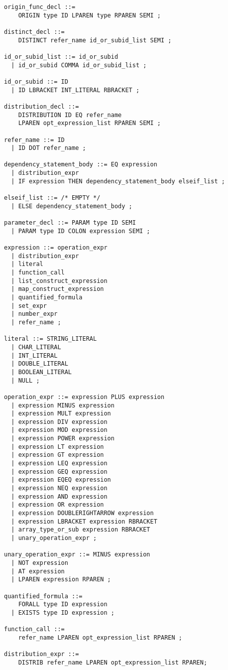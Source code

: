 \documentclass[12pt]{article}
\begin{document}
\begin{verbatim}
origin_func_decl ::= 
    ORIGIN type ID LPAREN type RPAREN SEMI ;

distinct_decl ::=
    DISTINCT refer_name id_or_subid_list SEMI ;

id_or_subid_list ::= id_or_subid
  | id_or_subid COMMA id_or_subid_list ;

id_or_subid ::= ID
  | ID LBRACKET INT_LITERAL RBRACKET ;

distribution_decl ::=
    DISTRIBUTION ID EQ refer_name
    LPAREN opt_expression_list RPAREN SEMI ;

refer_name ::= ID
  | ID DOT refer_name ;

dependency_statement_body ::= EQ expression
  | distribution_expr
  | IF expression THEN dependency_statement_body elseif_list ;

elseif_list ::= /* EMPTY */
  | ELSE dependency_statement_body ;

parameter_decl ::= PARAM type ID SEMI
  | PARAM type ID COLON expression SEMI ;

expression ::= operation_expr
  | distribution_expr
  | literal
  | function_call
  | list_construct_expression
  | map_construct_expression
  | quantified_formula
  | set_expr
  | number_expr
  | refer_name ;

literal ::= STRING_LITERAL
  | CHAR_LITERAL
  | INT_LITERAL
  | DOUBLE_LITERAL
  | BOOLEAN_LITERAL
  | NULL ;

operation_expr ::= expression PLUS expression
  | expression MINUS expression
  | expression MULT expression
  | expression DIV expression
  | expression MOD expression
  | expression POWER expression
  | expression LT expression
  | expression GT expression
  | expression LEQ expression
  | expression GEQ expression
  | expression EQEQ expression
  | expression NEQ expression
  | expression AND expression
  | expression OR expression
  | expression DOUBLERIGHTARROW expression
  | expression LBRACKET expression RBRACKET
  | array_type_or_sub expression RBRACKET
  | unary_operation_expr ;

unary_operation_expr ::= MINUS expression
  | NOT expression
  | AT expression
  | LPAREN expression RPAREN ;

quantified_formula ::= 
    FORALL type ID expression
  | EXISTS type ID expression ;

function_call ::= 
    refer_name LPAREN opt_expression_list RPAREN ;

distribution_expr ::= 
    DISTRIB refer_name LPAREN opt_expression_list RPAREN;


\end{verbatim}
\end{document}
